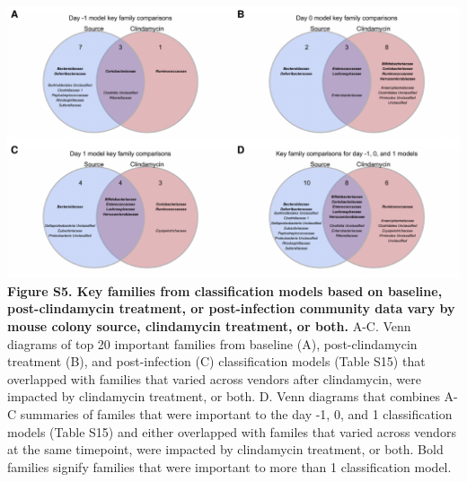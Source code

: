 \documentclass[11pt,]{article}
\begin{document}
\includegraphics{figure_S5.pdf} \textbf{Figure S5. Key families from
classification models based on baseline, post-clindamycin treatment, or
post-infection community data vary by mouse colony source, clindamycin
treatment, or both.} A-C. Venn diagrams of top 20 important families
from baseline (A), post-clindamycin treatment (B), and post-infection
(C) classification models (Table S15) that overlapped with families that
varied across vendors after clindamycin, were impacted by clindamycin
treatment, or both. D. Venn diagrams that combines A-C summaries of
familes that were important to the day -1, 0, and 1 classification
models (Table S15) and either overlapped with familes that varied across
vendors at the same timepoint, were impacted by clindamycin treatment,
or both. Bold families signify families that were important to more than
1 classification model.

\newpage
\end{document}
